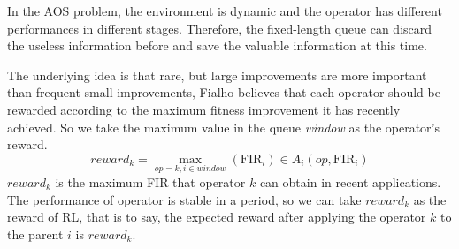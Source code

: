 \documentclass[journal]{IEEEtran}
\begin{document}
In the AOS problem, the environment is dynamic and the operator has different performances in different stages. Therefore, the fixed-length queue can discard the useless information before and save the valuable information at this time.

The underlying idea is that rare, but large improvements are more important than frequent small improvements, Fialho \cite{fialho2010comparison} believes that each operator should be rewarded according to the maximum fitness improvement it has recently achieved.
So we take the maximum value in the queue \textit{window} as the operator's reward.
\begin{equation}
  reward_k = \max_{op=k, i\in \textit{window}}(\text{FIR}_i) \in A_i(op,\text{FIR}_i)
\end{equation}
$reward_k$ is the maximum FIR that operator $k$ can obtain in recent applications.
The performance of operator is stable in a period, so we can take $reward_k$ as the reward of RL, that is to say, the expected reward after applying the operator $k$ to the parent $i$ is $reward_k$.
\end{document}
